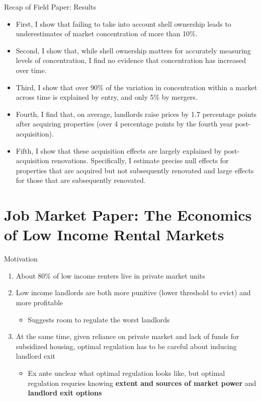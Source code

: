 \documentclass[10pt, xcolor=dvipsnames]{beamer}
\begin{document}
\begin{frame}{Recap of Field Paper: Results}
    \begin{itemize}
    \item First, I show that failing to take into account shell ownership leads to underestimates of market concentration of more than 10\%.
    \pause
    \item Second, I show that, while shell ownership matters for accurately measuring levels of concentration, I find no evidence that concentration has increased over time.
    \pause
    \item Third, I show that over 90\% of the variation in concentration within a market across time is explained by entry, and only 5\% by mergers.
    \pause
    \item Fourth, I find that, on average, landlords raise prices by 1.7 percentage points after acquiring properties (over 4 percentage points by the fourth year post-acquisition).
    \pause
    \item Fifth, I show that these acquisition effects are largely explained by post-acquisition renovations. Specifically, I estimate precise null effects for properties that are acquired but not subsequently renovated and large effects for those that are subsequently renovated.
  \end{itemize}
    
\end{frame}

\section{Job Market Paper: The Economics of Low Income Rental Markets}

\begin{frame}{Motivation}
    \begin{enumerate}
        \item About 80\% of low income renters live in private market units \parencite{jchs_2024, nhpd2024profiles}
        \pause
        \item Low income landlords are both more punitive (lower threshold to evict) and more profitable \parencite{Desmond_2019, Eisfeldt_2015,Damen_2025}
        \begin{itemize}
            \item Suggests room to regulate the worst landlords
        \end{itemize}
        \pause
        \item At the same time, given reliance on private market and lack of funds for subsidized housing, optimal regulation has to be careful about inducing landlord exit
        \begin{itemize}
            \item Ex ante unclear what optimal regulation looks like, but optimal regulation requries knowing \textbf{extent and sources of market power} and \textbf{landlord exit options}
        \end{itemize}
    \end{enumerate}

\end{frame}
\end{document}
